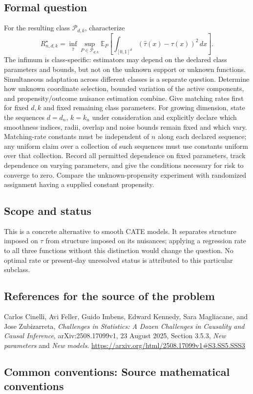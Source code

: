 \documentclass[11pt,a4paper]{article}
\newcommand{\E}{\mathbb E}
\begin{document}
\subsection*{Formal question}
For the resulting class $\mathcal P_{d,k}$, characterize
\[
 R_{n,d,k}^\star
 =\inf_{\widehat\tau}\sup_{P\in\mathcal P_{d,k}}
 \E_P\!\left[\int_{[0,1]^d}
       (\widehat\tau(x)-\tau(x))^2\,dx\right].
\]
The infimum is class-specific: estimators may depend on the declared class parameters and bounds, but not on the unknown support or unknown functions. Simultaneous adaptation across different classes is a separate question.
Determine how unknown coordinate selection, bounded variation of the active components, and propensity/outcome nuisance estimation combine. Give matching rates first for fixed $d,k$ and fixed remaining class parameters. For growing dimension, state the sequences $d=d_n$, $k=k_n$ under consideration and explicitly declare which smoothness indices, radii, overlap and noise bounds remain fixed and which vary. Matching-rate constants must be independent of $n$ along each declared sequence; any uniform claim over a collection of such sequences must use constants uniform over that collection. Record all permitted dependence on fixed parameters, track dependence on varying parameters, and give the conditions necessary for risk to converge to zero. Compare the unknown-propensity experiment with randomized assignment having a supplied constant propensity.
\subsection*{Scope and status}
This is a concrete alternative to smooth CATE models. It separates structure imposed on $\tau$ from structure imposed on its nuisances; applying a regression rate to all three functions without this distinction would change the question. No optimal rate or present-day unresolved status is attributed to this particular subclass.
\subsection*{References for the source of the problem}
Carlos Cinelli, Avi Feller, Guido Imbens, Edward Kennedy, Sara Magliacane, and Jose Zubizarreta, \emph{Challenges in Statistics: A Dozen Challenges in Causality and Causal Inference}, arXiv:2508.17099v1, 23 August 2025, Section 3.5.3, \emph{New parameters} and \emph{New models}.
\url{https://arxiv.org/html/2508.17099v1#S3.SS5.SSS3}

\subsection*{Common conventions: Source mathematical conventions}
\end{document}
